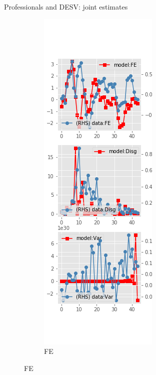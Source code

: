 \documentclass{beamer}
\begin{document}
\begin{frame}{Professionals and DESV: joint estimates}
	\begin{figure}[ht]
		\label{DESV_diag_joint_SPF}
		\begin{subfigure}[b]{0.2\textwidth}
			\centering
			\caption{FE}
			\includegraphics[width=\textwidth, height = 0.8\textheight]{figuresDraft/spf_de_est_sv_joint_diag0.png}

\end{subfigure}
\end{figure}
\end{frame}
\end{document}
